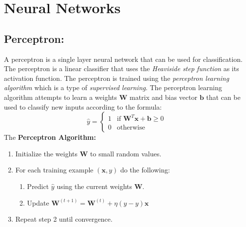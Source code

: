 \section{Neural Networks}
\subsection{Perceptron:} A perceptron is a single layer neural network that can be used for classification. The perceptron is a linear classifier that uses the \emph{Heaviside step function} as its activation function. The perceptron is trained using the \emph{perceptron learning algorithm} which is a type of \emph{supervised learning}. The perceptron learning algorithm attempts to learn a weights \(\mathbf{W}\) matrix and bias vector \(\mathbf{b}\) that can be used to classify new inputs according to the formula:
\[\hat{y}=\begin{cases}
    1 & \text{if } \mathbf{W}^T\mathbf{x}+\mathbf{b}\geq0\\
    0 & \text{otherwise}
\end{cases}\]
The \textbf{Perceptron Algorithm:}
\begin{enumerate}
    \item Initialize the weights \(\mathbf{W}\) to small random values.
    \item For each training example \((\mathbf{x},y)\) do the following:
    \begin{enumerate}
        \item Predict \(\hat{y}\) using the current weights \(\mathbf{W}\).
        \item Update \(\mathbf{W}^{(t+1)}=\mathbf{W}^{(t)}+\eta(y-\hat{y})\mathbf{x}\)
    \end{enumerate}
    \item Repeat step 2 until convergence.
\end{enumerate}
